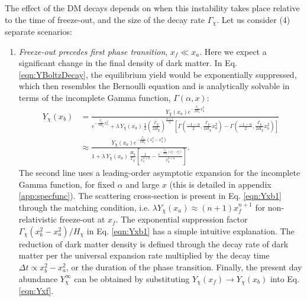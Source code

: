 The effect of the DM decays depends on when this instability takes place relative to the time of freeze-out, and the size of the decay rate $\Gamma_{\chi }$. Let us consider (4) separate scenarios:
\begin{enumerate}[label=(\arabic*)]
\item \textit{Freeze-out precedes first phase transition}, $x_f \ll x_a$. Here we expect a significant change in the final density of dark matter. In Eq. \ref{eqn:YBoltzDecay}, the equilibrium yield would be exponentially suppressed, which then resembles the Bernoulli equation and is analytically solvable in terms of the incomplete Gamma function, $\Gamma(\alpha,x)$:
\begin{align}
	Y_\chi(x_b) &= \frac{ Y_{\chi }(x_a)    e^{-\frac{\Gamma _{\chi }}{2 H_{\chi }} x_b^2}}{ e^{-\frac{\Gamma_{\chi}}{2 H_\chi}x_a^2}  + \lambda\, Y_\chi(x_a)\,\frac{1}{2} \left(\frac{\Gamma _{\chi }}{2 H_{\chi }}\right)^{\frac{n+1}{2}}
	\left[
		\Gamma \left(\frac{-1-n}{2},\frac{ \Gamma _{\chi }}{2 H_{\chi }} x_a^2\right)
 - \Gamma \left(\frac{-1-n}{2},\frac{ \Gamma _{\chi }}{2 H_{\chi }} x_b^2\right)
\right]}\\
&\approx
\frac{  Y_{\chi }(x_a)    e^{-\frac{\Gamma _{\chi }}{2 H_{\chi }} (x_b^2-x_a^2)}}{ 1 + \lambda\,Y_\chi(x_a) \,\frac{  H_\chi}{\Gamma_\chi} 
	\left[
		\frac{1}{x_a^{3+n}}
		-\frac{e^{-\frac{\Gamma_\chi}{2 H_\chi} (x_b^2-x_a^2)}}{x_b^{3+n}}
\right]}.
\label{eqn:Yxb1}
   \end{align}
The second line uses a leading-order asymptotic expansion for the incomplete Gamma function, for fixed $\alpha$ and large $x$ (this is detailed in appendix \ref{app:specfunc}). The scattering cross-section is present in Eq. \ref{eqn:Yxb1} through the matching condition, i.e. $\lambda Y_{\chi}(x_a) \approx (n+1)x_f^{n+1}$ for non-relativistic freeze-out at $x_f$. The exponential suppression factor $\Gamma_{\chi}(x^2_b - x^2_a)/H_{\chi}$ in Eq. \ref{eqn:Yxb1} has a simple intuitive explanation. The reduction of dark matter density is defined through the decay rate of dark matter per the universal expansion rate multiplied by the decay time $\Delta t \propto x^2_b - x^2_a$, or the duration of the phase transition. Finally, the present day abundance $Y^{\infty}_{\chi}$ can be obtained by substituting $Y_{\chi}(x_f) \rightarrow Y_{\chi}(x_b)$ into Eq. \ref{eqn:Yxf}.


\end{enumerate}
